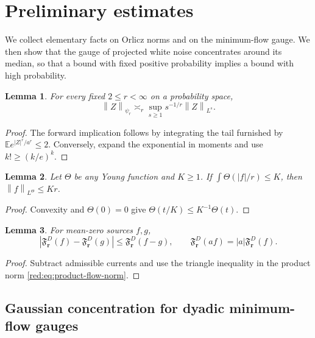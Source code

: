 \documentclass[11pt]{article}
\newtheorem{lemma}[lemma]{Lemma}
\theoremstyle{definition}
\theoremstyle{remark}
\numberwithin{equation}{section}
\newcommand{\E}{\mathbb E}
\newcommand{\norm}[1]{\left\|#1\right\|}
\newcommand{\abs}[1]{\left|#1\right|}
\begin{document}
\section{Preliminary estimates}

We collect elementary facts on Orlicz norms and on the minimum-flow
gauge. We then show that the gauge of projected white noise concentrates
around its median, so that a bound with fixed positive probability
implies a bound with high probability.

\begin{lemma}
\label{red:lem:moment}
For every fixed $2\le r<\infty$ on a probability space,
\begin{equation}
 \norm Z_{\psi_r}
 \asymp_r
 \sup_{s\ge1}s^{-1/r}\norm Z_{L^s}.
 \label{red:eq:moment-characterization}
\end{equation}
\end{lemma}

\begin{proof}
The forward implication follows by integrating the tail furnished by
$\E e^{|Z|^r/a^r}\le2$.  Conversely, expand the exponential in
moments and use $k!\ge(k/e)^k$.
\end{proof}

\begin{lemma}
\label{red:lem:absorb}
Let $\Theta$ be any Young function and $K\ge1$.  If
$\int\Theta(|f|/r)\le K$, then $\norm f_{L^\Theta}\le Kr$.
\end{lemma}

\begin{proof}
Convexity and $\Theta(0)=0$ give $\Theta(t/K)\le K^{-1}\Theta(t)$.
\end{proof}

\begin{lemma}
\label{red:lem:flow-lipschitz}
For mean-zero sources $f,g$,
\[
 \abs{\mathfrak F_{\boldsymbol r}^{D}(f)-
       \mathfrak F_{\boldsymbol r}^{D}(g)}
 \le \mathfrak F_{\boldsymbol r}^{D}(f-g),
 \qquad
 \mathfrak F_{\boldsymbol r}^{D}(af)=|a|\mathfrak F_{\boldsymbol r}^{D}(f).
\]
\end{lemma}

\begin{proof}
Subtract admissible currents and use the triangle inequality in the product
norm \eqref{red:eq:product-flow-norm}.
\end{proof}

\subsection{Gaussian concentration for dyadic minimum-flow gauges}
\label{red:subsec:gaussian-concentration}
\end{document}
